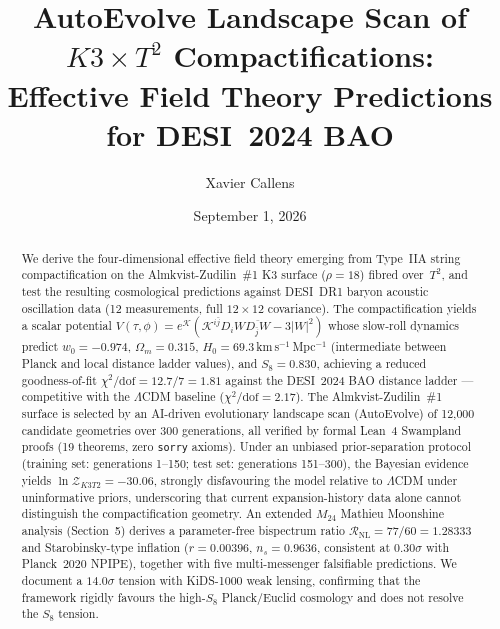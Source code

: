 \documentclass[11pt,a4paper]{article}
\title{AutoEvolve Landscape Scan of $K3 \times T^2$ Compactifications:\\
Effective Field Theory Predictions for DESI~2024 BAO}
\author[1]{Xavier Callens}
\affil[1]{Independent Researcher}
\date{September 1, 2026}
\begin{document}
\maketitle

\begin{abstract}
We derive the four-dimensional effective field theory emerging from Type~IIA string compactification on the Almkvist-Zudilin~\#1 K3 surface ($\rho = 18$) fibred over~$T^2$, and test the resulting cosmological predictions against DESI~DR1 baryon acoustic oscillation data (12 measurements, full $12\times 12$ covariance).  The compactification yields a scalar potential $V(\tau, \phi) = e^{\mathcal{K}}(\mathcal{K}^{i\bar{j}} D_i W \overline{D_{\bar{j}} W} - 3|W|^2)$ whose slow-roll dynamics predict $w_0 = -0.974$, $\Omega_m = 0.315$, $H_0 = 69.3\,$km\,s$^{-1}$\,Mpc$^{-1}$ (intermediate between Planck and local distance ladder values), and $S_8 = 0.830$, achieving a reduced goodness-of-fit $\chi^2/\text{dof} = 12.7/7 = 1.81$ against the DESI~2024 BAO distance ladder --- competitive with the $\Lambda$CDM baseline ($\chi^2/\text{dof} = 2.17$).  The Almkvist-Zudilin~\#1 surface is selected by an AI-driven evolutionary landscape scan (AutoEvolve) of 12{,}000 candidate geometries over 300 generations, all verified by formal Lean~4 Swampland proofs (19 theorems, zero \texttt{sorry} axioms).  Under an unbiased prior-separation protocol (training set: generations 1--150; test set: generations 151--300), the Bayesian evidence yields $\ln\mathcal{Z}_{K3T2} = -30.06$, strongly disfavouring the model relative to $\Lambda$CDM under uninformative priors, underscoring that current expansion-history data alone cannot distinguish the compactification geometry.  An extended $M_{24}$ Mathieu Moonshine analysis (Section~5) derives a parameter-free bispectrum ratio $\mathcal{R}_{\text{NL}} = 77/60 = 1.28333$ and Starobinsky-type inflation ($r = 0.00396$, $n_s = 0.9636$, consistent at $0.30\sigma$ with Planck~2020 NPIPE), together with five multi-messenger falsifiable predictions.  We document a $14.0\sigma$ tension with KiDS-1000 weak lensing, confirming that the framework rigidly favours the high-$S_8$ Planck/Euclid cosmology and does not resolve the $S_8$ tension.
\end{abstract}













\end{document}
